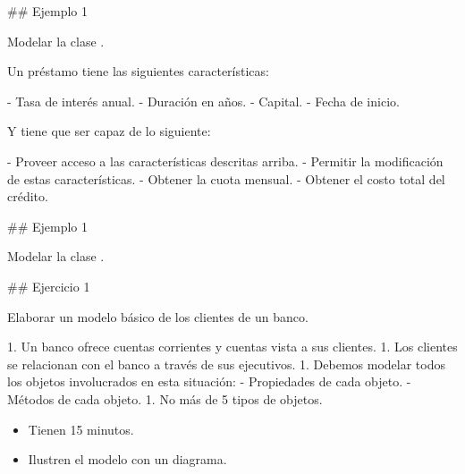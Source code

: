 ## Ejemplo 1

Modelar la clase .\newline

Un préstamo tiene las siguientes características:

- Tasa de interés anual.
- Duración en años.
- Capital.
- Fecha de inicio.

Y tiene que ser capaz de lo siguiente:

- Proveer acceso a las características descritas arriba.
- Permitir la modificación de estas características.
- Obtener la cuota mensual.
- Obtener el costo total del crédito.

## Ejemplo 1

Modelar la clase .\newline

\centering{}

## Ejercicio 1

Elaborar un modelo básico de los clientes de un banco.

1. Un banco ofrece cuentas corrientes y cuentas vista a sus clientes.
1. Los clientes se relacionan con el banco a través de sus ejecutivos.
1. Debemos modelar todos los objetos involucrados en esta situación:
    - Propiedades de cada objeto.
    - Métodos de cada objeto.
1. No más de 5 tipos de objetos.\vfill


\begin{center}\begin{customRoundedBox}{}%
\begin{itemize}
  \item Tienen 15 minutos.
  \item Ilustren el modelo con un diagrama.
\end{itemize}
\end{customRoundedBox}
\end{center}

